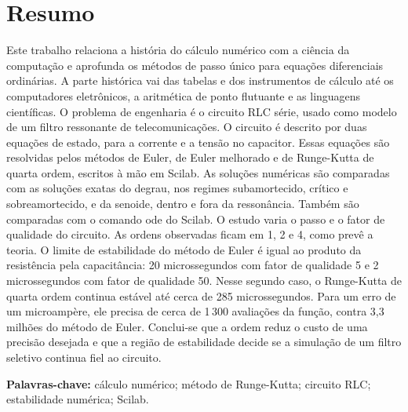\section*{Resumo}

Este trabalho relaciona a história do cálculo numérico com a ciência da computação e aprofunda os métodos de passo único para equações diferenciais ordinárias. A parte histórica vai das tabelas e dos instrumentos de cálculo até os computadores eletrônicos, a aritmética de ponto flutuante e as linguagens científicas. O problema de engenharia é o circuito RLC série, usado como modelo de um filtro ressonante de telecomunicações. O circuito é descrito por duas equações de estado, para a corrente e a tensão no capacitor. Essas equações são resolvidas pelos métodos de Euler, de Euler melhorado e de Runge-Kutta de quarta ordem, escritos à mão em Scilab. As soluções numéricas são comparadas com as soluções exatas do degrau, nos regimes subamortecido, crítico e sobreamortecido, e da senoide, dentro e fora da ressonância. Também são comparadas com o comando ode do Scilab. O estudo varia o passo e o fator de qualidade do circuito. As ordens observadas ficam em 1, 2 e 4, como prevê a teoria. O limite de estabilidade do método de Euler é igual ao produto da resistência pela capacitância: 20 microssegundos com fator de qualidade 5 e 2 microssegundos com fator de qualidade 50. Nesse segundo caso, o Runge-Kutta de quarta ordem continua estável até cerca de 285 microssegundos. Para um erro de um microampère, ele precisa de cerca de 1\,300 avaliações da função, contra 3,3 milhões do método de Euler. Conclui-se que a ordem reduz o custo de uma precisão desejada e que a região de estabilidade decide se a simulação de um filtro seletivo continua fiel ao circuito.

\vspace{0.6em}
\noindent\textbf{Palavras-chave:} cálculo numérico; método de Runge-Kutta; circuito RLC; estabilidade numérica; Scilab.

\clearpage
\tableofcontents
\clearpage
